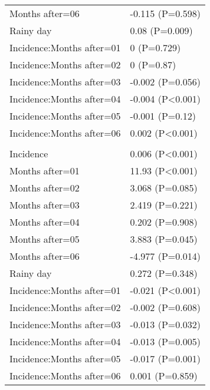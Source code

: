 \documentclass[]{article}
\begin{document}
\begin{longtable}[t]{ll}
\hspace{1em}Months after=06 & -0.115 (P=0.598)\\
\hspace{1em}Rainy day & 0.08 (P=0.009)\\
\hspace{1em}Incidence:Months after=01 & 0 (P=0.729)\\
\hspace{1em}Incidence:Months after=02 & 0 (P=0.87)\\
\hspace{1em}Incidence:Months after=03 & -0.002 (P=0.056)\\
\hspace{1em}Incidence:Months after=04 & -0.004 (P<0.001)\\
\hspace{1em}Incidence:Months after=05 & -0.001 (P=0.12)\\
\hspace{1em}Incidence:Months after=06 & 0.002 (P<0.001)\\
\addlinespace[1.5em]
\multicolumn{2}{l}{\textbf{Temporary not field worker}}\\
\hspace{1em}Incidence & 0.006 (P<0.001)\\
\hspace{1em}Months after=01 & 11.93 (P<0.001)\\
\hspace{1em}Months after=02 & 3.068 (P=0.085)\\
\hspace{1em}Months after=03 & 2.419 (P=0.221)\\
\hspace{1em}Months after=04 & 0.202 (P=0.908)\\
\hspace{1em}Months after=05 & 3.883 (P=0.045)\\
\hspace{1em}Months after=06 & -4.977 (P=0.014)\\
\hspace{1em}Rainy day & 0.272 (P=0.348)\\
\hspace{1em}Incidence:Months after=01 & -0.021 (P<0.001)\\
\hspace{1em}Incidence:Months after=02 & -0.002 (P=0.608)\\
\hspace{1em}Incidence:Months after=03 & -0.013 (P=0.032)\\
\hspace{1em}Incidence:Months after=04 & -0.013 (P=0.005)\\
\hspace{1em}Incidence:Months after=05 & -0.017 (P=0.001)\\
\hspace{1em}Incidence:Months after=06 & 0.001 (P=0.859)\\*
\end{longtable}
\end{document}
